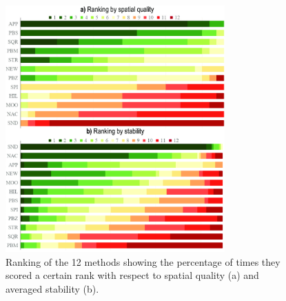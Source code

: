 \begin{figure}[htbp!]
\centering
\includegraphics[width=0.75\textwidth]{figures/initial-treemap-evaluation/rank-vertical.png}
\vspace{-0.1cm}
\caption{Ranking of the 12 methods showing the percentage of times they scored a certain rank with respect to spatial quality (a) and averaged stability (b).}
\vspace{-0.2cm}
\label{fig:rankchart}
\end{figure}

